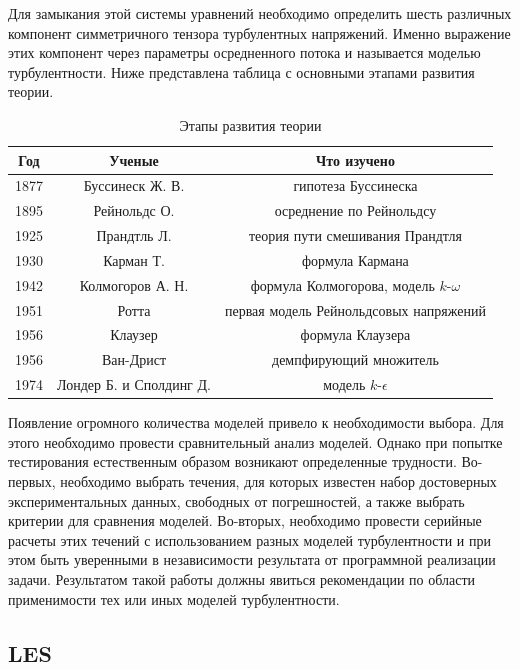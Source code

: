 	Для замыкания этой системы уравнений необходимо определить шесть различных компонент симметричного тензора турбулентных напряжений. Именно выражение этих компонент через параметры осредненного потока и называется моделью турбулентности. Ниже представлена таблица с основными этапами развития теории.
	
	\begin{table}[H]
		\begin{center}
			\begin{tabular}{|c|c|c|}
				\hline
				Год & Ученые & Что изучено\\
				\hline
				1877 & Буссинеск Ж. В. & гипотеза Буссинеска\\
				\hline
				1895 & Рейнольдс О. & осреднение по Рейнольдсу\\
				\hline
				1925 & Прандтль Л. & теория пути смешивания Прандтля\\
				\hline
				1930 & Карман Т. & формула Кармана\\
				\hline
				1942 & Колмогоров А. Н. & формула Колмогорова, модель $k$-$\omega$\\
				\hline
				1951 & Ротта & первая модель Рейнольдсовых напряжений\\
				\hline
				1956 & Клаузер & формула Клаузера\\
				\hline
				1956 & Ван-Дрист & демпфирующий множитель\\
				\hline
				1974 & Лондер Б. и Сполдинг Д. & модель $k$-$\epsilon$\\
				\hline
			\end{tabular}
		\end{center}
		\caption{Этапы развития теории}
	\end{table}
	
	Появление огромного количества моделей привело к необходимости выбора. Для этого необходимо провести сравнительный анализ моделей. Однако при попытке тестирования естественным образом возникают определенные трудности. Во-первых, необходимо выбрать течения, для которых известен набор достоверных экспериментальных данных, свободных от погрешностей, а также выбрать критерии для сравнения моделей. Во-вторых, необходимо провести серийные расчеты этих течений с использованием разных моделей турбулентности и при этом быть уверенными в независимости результата от программной реализации задачи. Результатом такой работы должны явиться рекомендации по области применимости тех или иных моделей турбулентности.

\subsection{LES}
	
